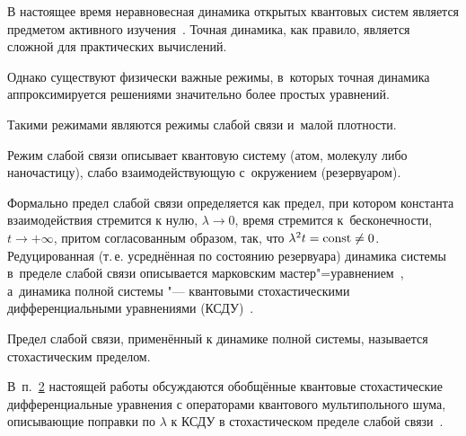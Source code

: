 





\date{21/XII/2010} %




\maketitle




В настоящее время неравновесная динамика открытых квантовых систем является предметом активного изучения~\cite{Breuer,ALV}. Точная динамика, как правило, является сложной для практических вычислений. 

Однако существуют физически важные режимы, в~которых точная динамика аппроксимируется решениями значительно более простых уравнений. 

Такими режимами являются режимы слабой связи и~малой плотности.



Режим слабой связи описывает квантовую систему (атом, молекулу либо наночастицу), слабо взаимодействующую с~окружением (резервуаром). 

Формально предел слабой связи определяется как предел, при котором константа взаимодействия стремится к нулю, $\lambda\to 0$, время стремится к~бесконечности, $t\to+\infty$, притом согласованным образом, так, что $\lambda^2t={\rm const}\ne 0$. Редуцированная (т.\,е. усреднённая по состоянию резервуара) динамика системы в~пределе слабой связи описывается марковским мастер"=уравнением~\cite{Breuer}, а~динамика полной системы "--- квантовыми стохастическими дифференциальными уравнениями (КСДУ)~\cite{ALV}. 

Предел слабой связи, применённый к динамике полной системы, называется стохастическим пределом. 

В~п.~\hyperlink{Sec:WCL}{2} настоящей работы обсуждаются обобщённые квантовые стохастические дифференциальные уравнения с операторами квантового мультипольного шума, описывающие поправки по $\lambda$ к КСДУ в стохастическом пределе слабой связи~\cite{IDAQP2002,PechenMN}.




